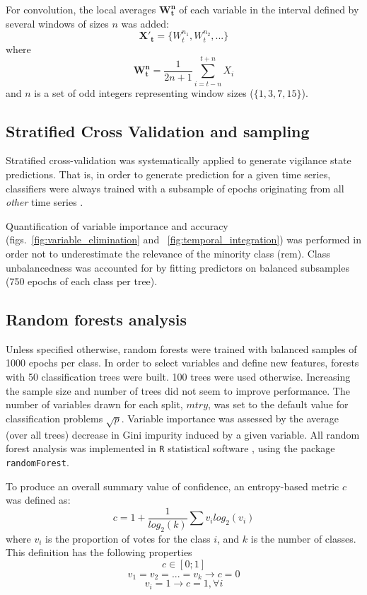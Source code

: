 For convolution, the local averages $\mathbf{W^n_t}$ of each variable in the interval defined by several windows of sizes $n$ was added:
\begin{equation}
\mathbf{{X'}_t} = \{W^{n_1}_t, W^{n_2}_t, ...\}
\label{eq:window}
\end{equation}
where
\[
\mathbf{W^n_t} = \frac{1}{2n+1} \sum_{i = t-n}^{t+n}{X_i}
\]
and $n$ is a set of odd integers representing window sizes (\eg $\{1,3,7,15\}$).



\subsection{Stratified Cross Validation and sampling}


Stratified cross-validation was systematically applied to generate vigilance state predictions.
That is, in order to generate prediction for a given time series, classifiers were always trained with a subsample of epochs
originating from all \emph{other} time series \cite{ding_querying_2008}.

Quantification of variable importance and accuracy (figs.~\ref{fig:variable_elimination} and ~\ref{fig:temporal_integration}) was performed in order 
not to underestimate the relevance of the minority class
(\gls{rem})\cite{boulesteix_overview_2012}.
Class  unbalancedness was accounted for by fitting predictors on balanced subsamples (750 epochs of each class per tree).


\subsection{Random forests analysis}
Unless specified otherwise, random forests\cite{breiman_random_2001} were trained
with balanced samples of 1000 epochs per class.
In order to select variables and define new features, forests with 50 classification trees were built.
100 trees were used otherwise.
Increasing the sample size and number of trees did not seem to improve performance.
The number of variables drawn for each split, $mtry$, was set to the default value for classification problems $\sqrt{p}$.
Variable importance was assessed by the average (over all trees) decrease in Gini impurity induced by a given variable.
All random forest analysis was implemented in \texttt{R} statistical software
\cite{r_core_team_r:_2014}, using the package
\texttt{randomForest}\cite{liaw_classification_2002}.

To produce an overall summary value of confidence, an entropy-based metric $c$ was defined as:
\begin{equation}
c = 1 + \frac{1}{log_2(k)}\sum{v_i  log_2(v_i)}
\label{eq:entropy}
\end{equation}
where $v_i$ is the proportion of votes for the class $i$, and $k$ is the number of classes. 
This definition has the following properties 
\[
c \in [0;1]
\]
\[
v_1 = v_2 = ... = v_k \rightarrow c = 0
\]
\[
v_i = 1 \rightarrow c = 1 , \forall i
\]





